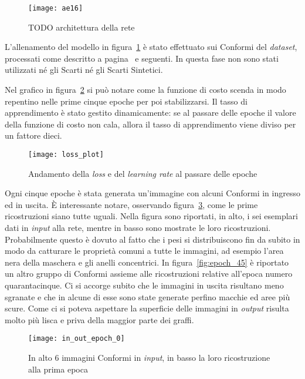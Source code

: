 \begin{figure}[ht]
  \begin{center}
    \texttt{[image: ae16]}
    \caption{TODO architettura della rete}
    \label{fig:ae16_arch}
  \end{center}
\end{figure}

L'allenamento del modello in figura~\ref{fig:ae16_arch} è stato effettuato sui Conformi del \textit{dataset}, processati come descritto a pagina~\pageref{prep} e seguenti.
In questa fase non sono stati utilizzati né gli Scarti né gli Scarti Sintetici.

Nel grafico in figura~\ref{fig:loss_plot} si può notare come la funzione di costo scenda in modo repentino nelle prime cinque epoche per poi stabilizzarsi.
Il tasso di apprendimento è stato gestito dinamicamente: se al passare delle epoche il valore della funzione di costo non cala, allora il tasso di apprendimento viene diviso per un fattore dieci.

\begin{figure}[ht] %
  \begin{center}
    \texttt{[image: loss\_plot]}
    \caption{Andamento della \textit{loss} e del \textit{learning rate} al passare delle epoche}
    \label{fig:loss_plot}
  \end{center}
\end{figure}

Ogni cinque epoche è stata generata un'immagine con alcuni Conformi in ingresso  ed in uscita.
È interessante notare, osservando figura~\ref{fig:epoch_0}, come le prime ricostruzioni siano tutte uguali.
Nella figura sono riportati, in alto, i sei esemplari dati in \textit{input} alla rete, mentre in basso sono mostrate le loro ricostruzioni.
Probabilmente questo è dovuto al fatto che i pesi si distribuiscono fin da subito in modo da catturare le proprietà comuni a tutte le immagini, ad esempio l'area nera della maschera e gli anelli concentrici.
In figura~\ref{fig:epoch_45} è riportato un altro gruppo di Conformi assieme alle ricostruzioni relative all'epoca numero quarantacinque.
Ci si accorge subito che le immagini in uscita risultano meno sgranate e che in alcune di esse sono state generate perfino macchie ed aree più scure.
Come ci si poteva aspettare la superficie delle immagini in \textit{output} risulta molto più lisca e priva della maggior parte dei graffi.

\begin{figure}[ht] %
  \begin{center}
    \texttt{[image: in\_out\_epoch\_0]}
    \caption{In alto 6 immagini Conformi in \textit{input}, in basso la loro ricostruzione alla prima epoca}
    \label{fig:epoch_0}
  \end{center}
\end{figure}

